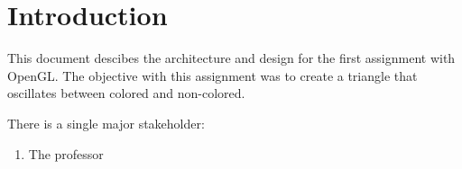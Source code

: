 \section{Introduction}
\label{section:intro}

This document descibes the architecture and design for the first assignment with OpenGL.
The objective with this assignment was to create a triangle that oscillates between colored and non-colored.

\vspace{1cm}

There is a single major stakeholder:
\begin{enumerate}
    \item The professor
\end{enumerate}